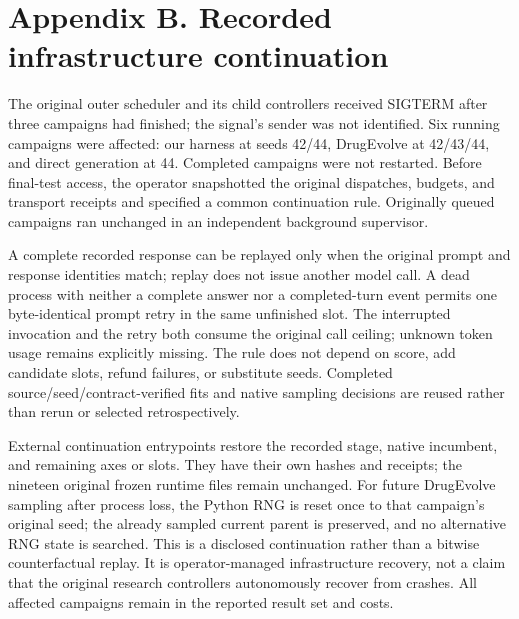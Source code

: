 \section*{Appendix B. Recorded infrastructure continuation}
The original outer scheduler and its child controllers received SIGTERM after three campaigns had finished; the signal's sender was not identified. Six running campaigns were affected: our harness at seeds 42/44, DrugEvolve at 42/43/44, and direct generation at 44. Completed campaigns were not restarted. Before final-test access, the operator snapshotted the original dispatches, budgets, and transport receipts and specified a common continuation rule. Originally queued campaigns ran unchanged in an independent background supervisor.

A complete recorded response can be replayed only when the original prompt and response identities match; replay does not issue another model call. A dead process with neither a complete answer nor a completed-turn event permits one byte-identical prompt retry in the same unfinished slot. The interrupted invocation and the retry both consume the original call ceiling; unknown token usage remains explicitly missing. The rule does not depend on score, add candidate slots, refund failures, or substitute seeds. Completed source/seed/contract-verified fits and native sampling decisions are reused rather than rerun or selected retrospectively.

External continuation entrypoints restore the recorded stage, native incumbent, and remaining axes or slots. They have their own hashes and receipts; the nineteen original frozen runtime files remain unchanged. For future DrugEvolve sampling after process loss, the Python RNG is reset once to that campaign's original seed; the already sampled current parent is preserved, and no alternative RNG state is searched. This is a disclosed continuation rather than a bitwise counterfactual replay. It is operator-managed infrastructure recovery, not a claim that the original research controllers autonomously recover from crashes. All affected campaigns remain in the reported result set and costs.
